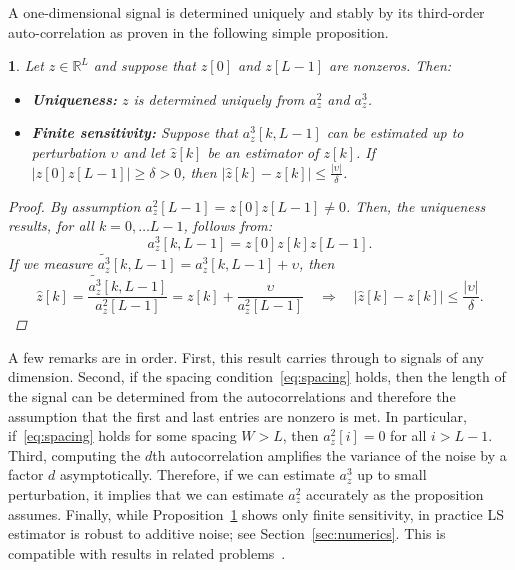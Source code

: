 \documentclass[english,11pt]{article}
\numberwithin{equation}{section}
\theoremstyle{plain}
\theoremstyle{definition}
\theoremstyle{remark}
\theoremstyle{plain}
\theoremstyle{remark}
\theoremstyle{plain}
\theoremstyle{plain}
\newtheorem{proposition}[thm]{\protect\propositionname}
\providecommand{\propositionname}{Proposition}
\newcommand{\RL}{\mathbb{R}^L}
\begin{document}
A one-dimensional signal is determined uniquely and stably by its third-order auto-correlation as proven in the following simple proposition.
\begin{proposition} \label{prop:uniqueness}
	Let $z\in\RL$ and suppose that $z[0]$ and $z[L-1]$ are nonzeros. Then:
	\begin{itemize}
		\item \textbf{Uniqueness:} 	 $z$  is determined uniquely from  $a_z^2$ and $a_z^3$.
        \item \textbf{Finite sensitivity:} 	Suppose that  $a_z^3[k,L-1]$ can be estimated up to  perturbation $\upsilon$ and let $\hat{z}[k]$ be an estimator of $z[k]$. If $\vert z[0]z[L-1]\vert \geq \delta>0$, then $\vert \hat{z}[k] - z[k]\vert\leq \frac{\vert \upsilon\vert }{\delta}$. 
	\end{itemize}
	\begin{proof}
		By assumption $a_z^2[L-1] = z[0]z[L-1]\neq 0$.
		Then, the uniqueness results, for all $k=0,\ldots L-1$,  follows from:
		\begin{equation*}
		a_z^3[k,L-1] = z[0]z[k]z[L-1].
		\end{equation*}
		If we measure $\tilde{a_z^3}[k,L-1] = a_z^3[k,L-1]+\upsilon$, then 
		\begin{equation*}
		\hat{z}[k] = \frac{\tilde{a_z^3}[k,L-1]}{a_z^2[L-1]} = z[k]+\frac{\upsilon}{a_z^2[L-1]} \quad \Rightarrow \quad \vert \hat{z}[k] - {z}[k]\vert \leq \frac{\vert\upsilon\vert}{\delta}.
		\end{equation*} 
	\end{proof}
\end{proposition}

A few remarks are in order. First, this result carries through to signals of any dimension.
Second, if the spacing condition~\eqref{eq:spacing} holds, then the length of the signal can be determined from the autocorrelations and 
therefore the assumption that the first and last entries are nonzero is met. In particular, if~\eqref{eq:spacing} holds for some spacing $W>L$, then $a_z^2[i]=0$ for all $i>L-1$.
Third, computing the $d$th autocorrelation amplifies the variance of the noise by a factor $d$ asymptotically. Therefore, if we can estimate $a_z^3$ up to small perturbation, it implies that we can estimate $a_z^2$ accurately as the proposition assumes. 
Finally, while Proposition~\ref{prop:uniqueness} shows only finite sensitivity, in practice LS estimator is robust to additive noise; see Section~\ref{sec:numerics}. This is compatible with results in related problems~\cite{bendory2017bispectrum,boumal2017heterogeneous}.
\end{document}

